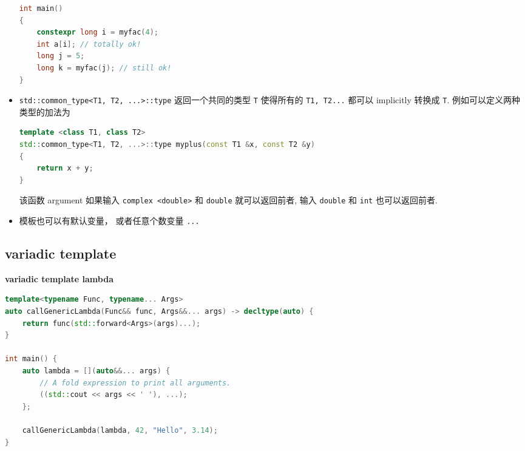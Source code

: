 \begin{itemize}
\begin{lstlisting}[language=cpp]
int main()
{
	constexpr long i = myfac(4);
	int a[i]; // totally ok!
	long j = 5;
	long k = myfac(j); // still ok!
}
\end{lstlisting}
\item \verb`std::common_type<T1, T2, ...>::type` 返回一个共同的类型 \verb`T` 使得所有的 \verb`T1, T2...` 都可以 implicitly 转换成 \verb`T`. 例如可以定义两种类型的加法为
\begin{lstlisting}[language=cpp]
template <class T1, class T2>
std::common_type<T1, T2, ...>::type myplus(const T1 &x, const T2 &y)
{
	return x + y;
}
\end{lstlisting}
该函数 argument 如果输入 \verb`complex <double>` 和 \verb`double` 就可以返回前者, 输入 \verb`double` 和 \verb`int` 也可以返回前者.
\item 模板也可以有默认变量， 或者任意个数变量 \verb`...`
\end{itemize}

\subsection{variadic template}
\textbf{variadic template lambda}

\begin{lstlisting}[language=cpp]
template<typename Func, typename... Args>
auto callGenericLambda(Func&& func, Args&&... args) -> decltype(auto) {
    return func(std::forward<Args>(args)...);
}

int main() {
    auto lambda = [](auto&&... args) {
        // A fold expression to print all arguments.
        ((std::cout << args << ' '), ...);
    };

    callGenericLambda(lambda, 42, "Hello", 3.14);
}
\end{lstlisting}
